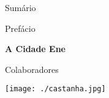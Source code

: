 \thispagestyle{empty}
\MyriadPro
Sumário

\hspace{2cm}{\footnotesize\Georgia{\pageref{prefacio}}} \hspace{.4cm} {\footnotesize{Prefácio}} 

\medskip

\hspace{2cm}{\footnotesize\Georgia{\pageref{cidade}}} \hspace{.27cm} {\footnotesize\textbf{A Cidade Ene}} 

\medskip

\hspace{2cm}{\footnotesize\Georgia{\pageref{colaboradores}}} \hspace{.07cm} {\footnotesize{Colaboradores}}

\begin{flushright}
\vfill
\texttt{[image: ./castanha.jpg]}
\end{flushright}

\pagebreak
\thispagestyle{empty}